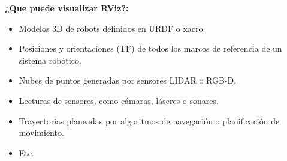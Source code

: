 \textbf{¿Que puede visualizar RViz?:}
\begin{itemize}
    \item Modelos 3D de robots definidos en URDF o xacro.
    \item Posiciones y orientaciones (TF) de todos los marcos de referencia de un sistema robótico.
    \item Nubes de puntos generadas por sensores LIDAR o RGB-D.
    \item Lecturas de sensores, como cámaras, láseres o sonares.
    \item Trayectorias planeadas por algoritmos de navegación o planificación de movimiento.
    \item Etc.
\end{itemize}